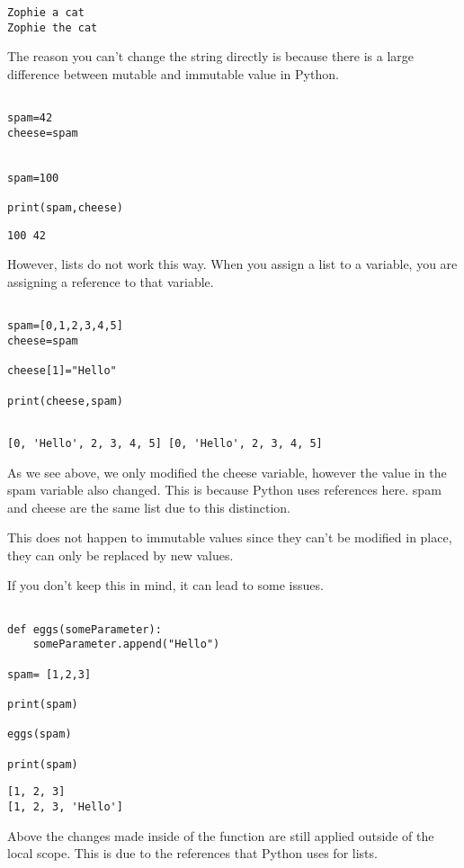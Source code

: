 \documentclass[11pt]{article}
\begin{document}
\begin{verbatim}
Zophie a cat
Zophie the cat
\end{verbatim}


The reason you can't change the string directly is because there is a large difference between mutable and immutable value in Python.


\begin{verbatim}

spam=42
cheese=spam


spam=100

print(spam,cheese)

\end{verbatim}

\begin{verbatim}
100 42
\end{verbatim}


However, lists do not work this way. When you assign a list to a variable, you are assigning a reference to that variable.


\begin{verbatim}

spam=[0,1,2,3,4,5]
cheese=spam

cheese[1]="Hello"

print(cheese,spam)


\end{verbatim}

\begin{verbatim}
[0, 'Hello', 2, 3, 4, 5] [0, 'Hello', 2, 3, 4, 5]
\end{verbatim}


As we see above, we only modified the cheese variable, however the value in the spam variable also changed. This is because Python uses references here. spam and cheese are the same list due to this distinction.


This does not happen to immutable values since they can't be modified in place, they can only be replaced by new values.

If you don't keep this in mind, it can lead to some issues.

\begin{verbatim}

def eggs(someParameter):
    someParameter.append("Hello")

spam= [1,2,3]

print(spam)

eggs(spam)

print(spam)

\end{verbatim}

\begin{verbatim}
[1, 2, 3]
[1, 2, 3, 'Hello']
\end{verbatim}


Above the changes made inside of the function are still applied outside of the local scope. This is due to the references that Python uses for lists.
\end{document}
